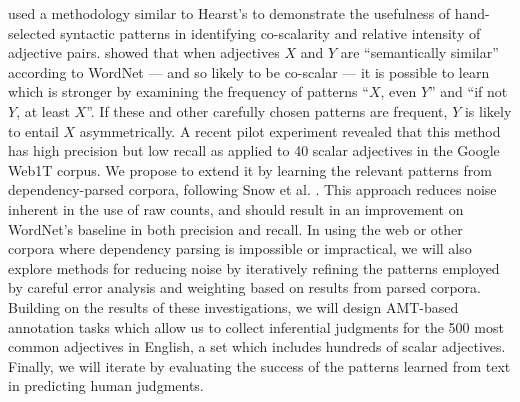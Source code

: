 \documentclass[10pt]{article}
\begin{document}
\cite{sheinmanetal2013,sheinman2009adjscales} used a methodology similar to Hearst's \cite{hearst1992automatic} to demonstrate the usefulness of  hand-selected syntactic patterns in identifying co-scalarity and relative intensity of adjective pairs. 
\cite{sheinmanetal2013} showed that when adjectives $X$ and $Y$ are ``semantically similar'' according to WordNet --- and so likely to be co-scalar --- it is possible to learn which is stronger by examining the frequency of patterns ``$X$, even $Y$'' and ``if not $Y$, at least $X$''. If these and other carefully chosen patterns are frequent, $Y$ is likely to entail $X$ asymmetrically. A recent pilot experiment revealed that this method has high precision but low recall as applied to 40 scalar adjectives in the Google Web1T corpus. We propose to extend it by learning the relevant patterns from dependency-parsed corpora, following Snow et al. \cite{snow04,snow2006semantic}. This approach reduces noise inherent in the use of raw counts, and should result in an improvement on WordNet's baseline in both precision and recall. In using the web or other corpora where dependency parsing is impossible or impractical, we will also explore methods for reducing noise by iteratively refining the patterns employed by careful error analysis and weighting based on results from parsed corpora.
Building on the results of these investigations, we will design AMT-based annotation tasks which allow us to collect inferential judgments for the 500 most common adjectives in English, a set which includes hundreds of scalar adjectives. Finally, we will iterate by evaluating the success of the patterns learned from text in predicting human judgments.
\end{document}
